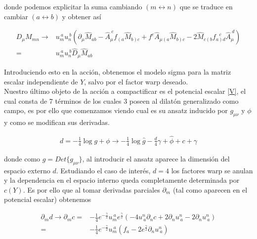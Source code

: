 \documentclass{article}
\numberwithin{equation}{section}
\begin{document}
donde podemos explicitar la suma cambiando $ \left(m \leftrightarrow n\right) $ que se traduce en cambiar $ \left(a \leftrightarrow b\right) $ y obtener así

\begin{equation}\label{hatDM}
\begin{aligned}
D_{\mu} M_{m n} \longrightarrow& u_{m}^{ \ a} u_{n}^{ \ b} \left( \partial_{\mu} \hat{M}_{a b} - \hat{A}_{\mu}^{\ c} f_{\left( a \right.}\hat{M}_{\left. b\right) c} + f^c \hat{A}_{\mu \left( a\right.} \hat{M}_{\left. b\right) c} - 2 \hat{M}_{c \left( b\right.}f_{\left. a\right) d}^{\ \ \  c} \hat{A}_{\mu}^{\ d}  \right)\\
=& u_{m}^{ \ a} u_{n}^{ \ b} \hat{D}_{\mu} \hat{M}_{a b}
\end{aligned}
\end{equation}

Introduciendo esto en la acción, obtenemos el modelo sigma para la matriz escalar independiente de $ Y $, salvo por el factor warp deseado.\\


Nuestro último objeto de la acción a compactificar es el potencial escalar \ref{V}, el cual consta de 7 términos de los cuales 3 poseen al dilatón generalizado como campo, es por ello que comenzamos viendo cual es su ansatz inducido por $ g_{\mu \nu} $ y $ \phi $ y como se modifican sus derivadas.

\begin{equation}
\begin{aligned}
d = -\frac{1}{4} \log g + \phi \longrightarrow -\frac{1}{4} \log \hat{g} - \frac{d}{4} \gamma + \hat{\phi}  + c + \gamma
\end{aligned}
\end{equation}

donde como $ g=Det\{ g_{\mu \nu}\} $, al introducir el ansatz aparece la dimensión del espacio externo $ d $. Estudiando el caso de interés, $ d=4 $ los factores warp se anulan y la dependencia en el espacio interno queda completamente determinada por $ c(Y) $. Es por ello que al tomar derivadas parciales $ \partial_m $ (tal como aparecen en el potencial escalar) obtenemos

\begin{equation}
\begin{aligned}
\partial_m d \longrightarrow \partial_m c =& -\frac{1}{4} e^{-\frac{\gamma}{2}} u_{m}^{\ a} e^{\frac{\gamma}{2}} \left( -4  u^{n}_{\ a}\partial_n c + 2\partial_n u^{n}_{\ a}  -2\partial_n u^{n}_{\ a}\right)\\
=& -\frac{1}{4} e^{-\frac{\gamma}{2}} u_{m}^{\ a} \left( f_a  -2 e^{\frac{\gamma}{2}} \partial_n u^{n}_{\ a}\right)
\end{aligned}
\end{equation} 
\end{document}
